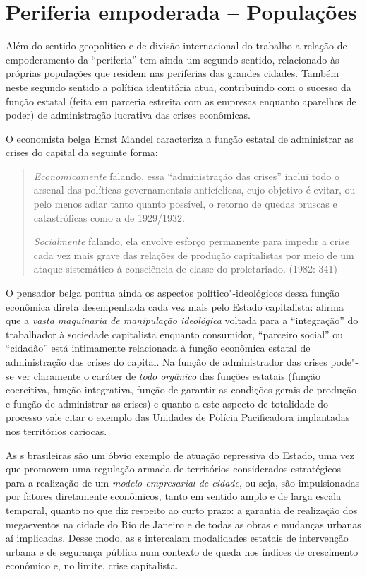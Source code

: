 \chapter{Periferia empoderada -- Populações}

Além do sentido geopolítico e de divisão internacional do trabalho a
relação de empoderamento da ``periferia'' tem ainda um segundo sentido,
relacionado às próprias populações que residem nas periferias das
grandes cidades. Também neste segundo sentido a política identitária
atua, contribuindo com o sucesso da função estatal (feita em parceria
estreita com as empresas enquanto aparelhos de poder) de administração
lucrativa das crises econômicas.

O economista belga Ernst Mandel caracteriza a função estatal de
administrar as crises do capital da seguinte forma:

\begin{quote}
\emph{Economicamente} falando, essa ``administração das crises''
inclui todo o arsenal das políticas governamentais anticíclicas, cujo
objetivo é evitar, ou pelo menos adiar tanto quanto possível, o retorno
de quedas bruscas e catastróficas como a de 1929/1932.

\emph{Socialmente} falando, ela envolve esforço permanente para
impedir a crise cada vez mais grave das relações de produção
capitalistas por meio de um ataque sistemático à consciência de classe
do proletariado. (1982: 341)
\end{quote}

O pensador belga pontua ainda os aspectos político"-ideológicos dessa
função econômica direta desempenhada cada vez mais pelo Estado
capitalista: afirma que a \emph{vasta maquinaria de manipulação
ideológica} voltada para a ``integração'' do trabalhador à sociedade
capitalista enquanto consumidor, ``parceiro social'' ou ``cidadão'' está
intimamente relacionada à função econômica estatal de administração das
crises do capital. Na função de administrador das crises pode"-se ver
claramente o caráter de \emph{todo orgânico} das funções estatais
(função coercitiva, função integrativa, função de garantir as condições
gerais de produção e função de administrar as crises) e quanto a este
aspecto de totalidade do processo vale citar o exemplo das Unidades de
Polícia Pacificadora implantadas nos territórios cariocas.

As s brasileiras são um óbvio exemplo de atuação repressiva do
Estado, uma vez que promovem uma regulação armada de territórios
considerados estratégicos para a realização de um \emph{modelo
empresarial de cidade}, ou seja, são impulsionadas por fatores
diretamente econômicos, tanto em sentido amplo e de larga escala
temporal, quanto no que diz respeito ao curto prazo: a garantia de
realização dos megaeventos na cidade do Rio de Janeiro e de todas as
obras e mudanças urbanas aí implicadas. Desse modo, as s intercalam
modalidades estatais de intervenção urbana e de segurança pública num
contexto de queda nos índices de crescimento econômico e, no limite,
crise capitalista.

